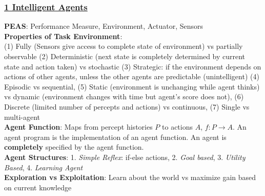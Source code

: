 \documentclass{article}
\begin{document}
\singlespacing %

\pagestyle{fancy}
\fancyhf{}
\renewcommand{\headrulewidth}{0pt}


\titlespacing*{\subsubsection}{0pt}{0pt}{0pt}

\begin{multicols*}{3}

\subsubsection*{\underline{1 Intelligent Agents}}
\textbf{PEAS}: Performance Measure, Environment, Actuator, Sensors\\
\textbf{Properties of Task Environment}: \\
(1) Fully (Sensors give access to complete state of environment) vs partially observable (2) Deterministic (next state is completely determined by current state and action taken) vs stochastic (3) Strategic: if the environment depends on actions of other agents, unless the other agents are predictable (unintelligent) (4) Episodic vs sequential, (5) Static (environment is unchanging while agent thinks) vs dynamic (environment changes with time but agent's score does not), (6) Discrete (limited number of percepts and actions) vs continuous, (7) Single vs multi-agent \\
\textbf{Agent Function}: Maps from percept histories $P$ to actions $A$, $f:P\to A$. An agent program is the implementation of an agent function. An agent is \textbf{completely} specified by the agent function. \\
\textbf{Agent Structures}: 1. \textit{Simple Reflex}: if-else actions, 2. \textit{Goal based}, 3. \textit{Utility Based}, 4. \textit{Learning Agent}\\
\textbf{Exploration vs Exploitation}: Learn about the world vs maximize gain based on current knowledge

\end{multicols*}
\end{document}
